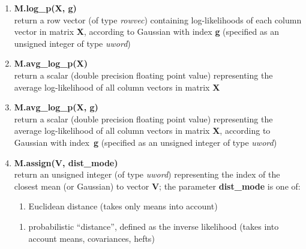 \begin{enumerate}[{$\bullet$}]
\item
{\bf M.log\_p(X, g)}\\
return a row vector (of type {\it rowvec}) containing log-likelihoods of each column vector in matrix {\bf X},
according to Gaussian with index {\bf g}  (specified as an unsigned integer of type {\it uword})

\item
{\bf M.avg\_log\_p(X)}\\
return a scalar (double precision floating point value) representing the average log-likelihood of all column vectors in matrix {\bf X}

\item
{\bf M.avg\_log\_p(X, g)}\\
return a scalar (double precision floating point value) representing the average log-likelihood of all column vectors in matrix {\bf X},
according to Gaussian with index~{\bf g}  (specified as an unsigned integer of type {\it uword})

\item
{\bf M.assign(V, dist\_mode)}\\
return an unsigned integer (of type {\it uword}) representing the index of the
closest mean (or Gaussian) to vector {\bf V}; the parameter {\bf dist\_mode} is one
of:
\begin{small}
\begin{enumerate}
\item
Euclidean distance (takes only means into account)
\end{enumerate}

\begin{enumerate}
\item
probabilistic ``distance'', defined as the inverse likelihood (takes into account means, covariances, hefts)
\end{enumerate}
\end{small}



\end{enumerate}
